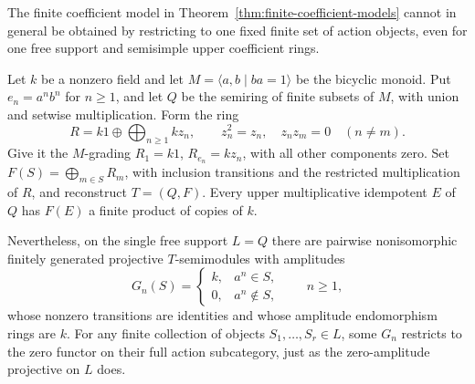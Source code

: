 \begin{example}
\label{ex:no-fixed-finite-objects}
The finite coefficient model in Theorem~\ref{thm:finite-coefficient-models}
cannot in general be obtained by restricting to one fixed finite
set of action objects, even for one free support and semisimple
upper coefficient rings.

Let $k$ be a nonzero field and let
$M=\langle a,b\mid ba=1\rangle$ be the bicyclic monoid. Put
$e_n=a^nb^n$ for $n\geq1$, and let $Q$ be the semiring of finite
subsets of $M$, with union and setwise multiplication. Form the ring
\[
 R=k1\oplus\bigoplus_{n\geq1}kz_n,
 \qquad z_n^2=z_n,\quad z_nz_m=0\quad(n\ne m).
\]
Give it the $M$-grading $R_1=k1$, $R_{e_n}=kz_n$, with all
other components zero. Set $F(S)=\bigoplus_{m\in S}R_m$, with
inclusion transitions and the restricted multiplication of $R$,
and reconstruct $T=(Q,F)$. Every upper multiplicative idempotent
$E$ of $Q$ has $F(E)$ a finite product of copies of $k$.

Nevertheless, on the single free support $L=Q$ there are pairwise
nonisomorphic finitely generated projective $T$-semimodules with
amplitudes
\[
 G_n(S)=
 \begin{cases}k,&a^n\in S,\\0,&a^n\notin S,\end{cases}
 \qquad n\geq1,
\]
whose nonzero transitions are identities and whose amplitude
endomorphism rings are $k$. For any finite collection of objects
$S_1,\ldots,S_r\in L$, some $G_n$ restricts to the zero functor
on their full action subcategory, just as the zero-amplitude
projective on $L$ does.
\end{example}
